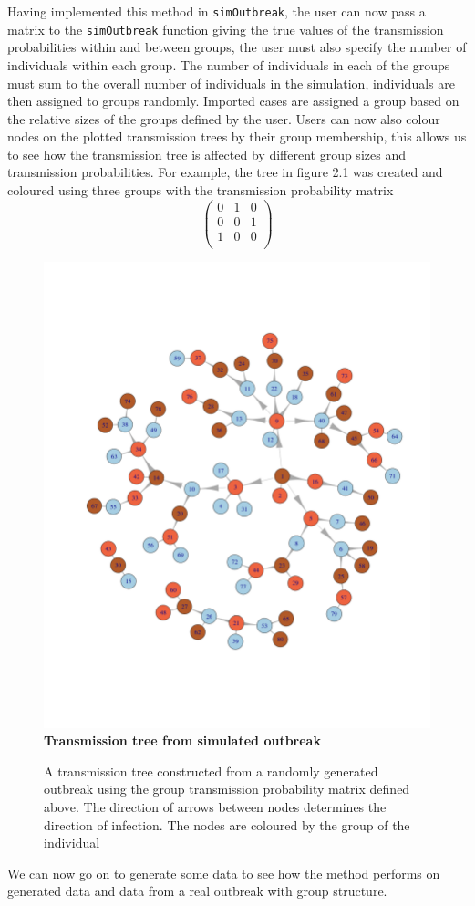 \documentclass[11pt,a4paper]{report}
\begin{document}
Having implemented this method in {\tt simOutbreak}, the user can now pass a matrix to the {\tt simOutbreak} function giving the true values of the transmission probabilities within and between groups, the user must also specify the number of individuals within each group. The number of individuals in each of the groups must sum to the overall number of individuals in the simulation, individuals are then assigned to groups randomly. Imported cases are assigned a group based on the relative sizes of the groups defined by the user. Users can now also colour nodes on the plotted transmission trees by their group membership, this allows us to see how the transmission tree is affected by different group sizes and transmission probabilities. For example, the tree in figure 2.1 was created and coloured using three groups with the transmission probability matrix
\[ \left( \begin{array}{ccc}
0 & 1 & 0 \\
0 & 0 & 1 \\
1 & 0 & 0 \\
\end{array} \right) \]
\begin{figure}[h!]
\centering 
\includegraphics[scale=0.3]{treexample.png} \newline
{\bf Transmission tree from simulated outbreak}
\caption{A transmission tree constructed from a randomly generated outbreak using the group transmission probability matrix defined above. The direction of arrows between nodes determines the direction of infection. The nodes are coloured by the group of the individual}
\end{figure}
We can now go on to generate some data to see how the method performs on generated data and data from a real outbreak with group structure.
\end{document}
